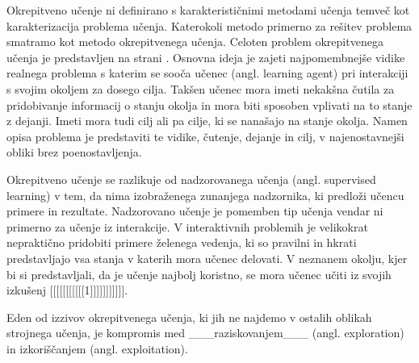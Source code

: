 \documentclass[a4paper, oneside, 12pt]{article}
\begin{document}
Okrepitveno učenje ni definirano s karakterističnimi metodami učenja temveč kot karakterizacija problema učenja. Katerokoli metodo primerno za rešitev problema smatramo kot metodo okrepitvenega učenja. Celoten problem okrepitvenega učenja je predstavljen na strani \pageref{section:problem}. Osnovna ideja je zajeti najpomembnejše vidike realnega problema s katerim se sooča učenec (angl. learning agent) pri interakciji s svojim okoljem za dosego cilja. Takšen učenec mora imeti nekakšna čutila za pridobivanje informacij o stanju okolja in mora biti sposoben vplivati na to stanje z dejanji. Imeti mora tudi cilj ali pa cilje, ki se nanašajo na stanje okolja. Namen opisa problema je predstaviti te vidike, čutenje, dejanje in cilj, v najenostavnejši obliki brez poenostavljenja.

Okrepitveno učenje se razlikuje od nadzorovanega učenja (angl. supervised learning) v tem, da nima izobraženega zunanjega nadzornika, ki predloži učencu primere in rezultate. Nadzorovano učenje je pomemben tip učenja vendar ni primerno za učenje iz interakcije. V interaktivnih problemih je velikokrat nepraktično pridobiti primere želenega vedenja, ki so pravilni in hkrati predstavljajo vsa stanja v katerih mora učenec delovati. V neznanem okolju, kjer bi si predstavljali, da je učenje najbolj koristno, se mora učenec učiti iz svojih izkušenj [[[[[[[[[[[1]]]]]]]]]]].

Eden od izzivov okrepitvenega učenja, ki jih ne najdemo v ostalih oblikah strojnega učenja, je kompromis med ___raziskovanjem___ (angl. exploration) in izkoriščanjem (angl. exploitation). 


\end{document}
